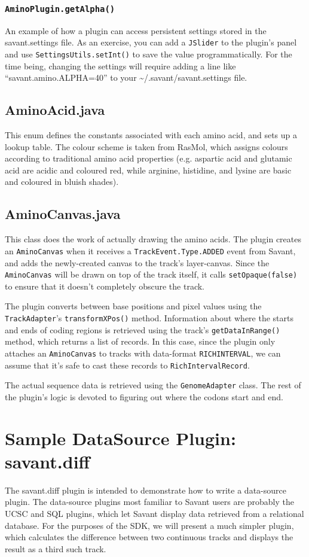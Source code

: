 \documentclass[times,11pt]{report}
\begin{document}
\subsection{\tt AminoPlugin.getAlpha()}
An example of how a plugin can access persistent settings stored in the savant.settings file.  As an exercise, you can add a {\tt JSlider} to the plugin's panel and use {\tt SettingsUtils.setInt()} to save the value programmatically.  For the time being, changing the settings will require adding a line like ``savant.amino.ALPHA=40'' to your \textasciitilde/.savant/savant.settings file.

\section{AminoAcid.java}
This enum defines the constants associated with each amino acid, and sets up a lookup table.  The colour scheme is taken from RasMol, which assigns colours according to traditional amino acid properties (e.g. aspartic acid and glutamic acid are acidic and coloured red, while arginine, histidine, and lysine are basic and coloured in bluish shades).

\section{AminoCanvas.java}
This class does the work of actually drawing the amino acids.  The plugin creates an {\tt AminoCanvas} when it receives a {\tt TrackEvent.Type.ADDED} event from Savant, and adds the newly-created canvas to the track's layer-canvas.  Since the {\tt AminoCanvas} will be drawn on top of the track itself, it calls {\tt setOpaque(false)} to ensure that it doesn't completely obscure the track.

The plugin converts between base positions and pixel values using the {\tt TrackAdapter}'s {\tt transformXPos()} method. Information about where the starts and ends of coding regions is retrieved using the track's {\tt getDataInRange()} method, which returns a list of records.  In this case, since the plugin only attaches an {\tt AminoCanvas} to tracks with data-format {\tt RICH\textunderscore INTERVAL}, we can assume that it's safe to cast these records to {\tt RichIntervalRecord}.

The actual sequence data is retrieved using the {\tt GenomeAdapter} class.  The rest of the plugin's logic is devoted to figuring out where the codons start and end.

\chapter{Sample DataSource Plugin: savant.diff}
\label{SampleDataSourcePlugin}
The savant.diff plugin is intended to demonstrate how to write a data-source plugin.  The data-source plugins most familiar to Savant users are probably the UCSC and SQL plugins, which let Savant display data retrieved from a relational database.  For the purposes of the SDK, we will present a much simpler plugin, which calculates the difference between two continuous tracks and displays the result as a third such track.
\end{document}

